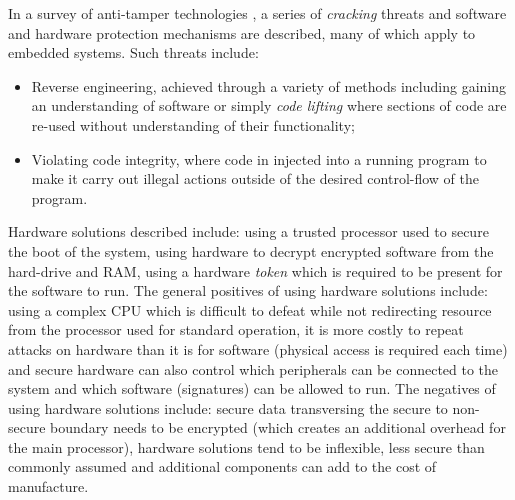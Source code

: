 In a survey of anti-tamper technologies \cite{Bryant2004}, a series of \textit{cracking} threats and software and hardware protection mechanisms are described, many of which apply to embedded systems. Such threats include: 
\begin{itemize}
	\item Reverse engineering, achieved through a variety of methods including gaining an understanding	of software or simply \textit{code lifting} where sections of code are re-used without understanding of their functionality;
	\item Violating code integrity, where code in injected into a running program to make it carry out illegal actions outside of the desired control-flow of the program.
\end{itemize} 
Hardware solutions described include: using a trusted processor used to secure the boot of the system, using hardware to decrypt encrypted software from the hard-drive and RAM, using a hardware \textit{token} which is required to be present for the software to run. The general positives of using hardware solutions include: using a complex CPU which is difficult to defeat while not redirecting resource from the processor used for standard operation, it is more costly to repeat attacks on hardware than it is for software (physical access is required each time) and secure hardware can also control which peripherals can be connected to the system and which software (signatures) can be allowed to run. The negatives of using hardware solutions include: secure data transversing the secure to non-secure boundary needs to be encrypted (which creates an additional overhead for the main processor), hardware solutions tend to be inflexible, less secure than commonly assumed and additional components can add to the cost of manufacture.

